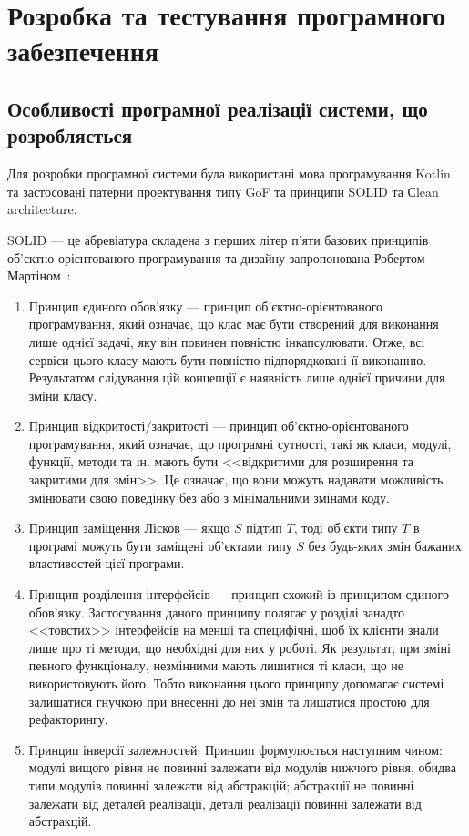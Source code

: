 \section{Розробка та тестування програмного забезпечення}
\subsection{Особливості програмної реалізації системи, що розробляється}
Для розробки програмної системи була використані мова програмування Kotlin та застосовані патерни проектування типу GoF та принципи SOLID та Сlean architecture.

SOLID --- це абревіатура складена з перших літер п'яти базових принципів об'єктно-орієнтованого програмування та дизайну запропонована Робертом Мартіном~\cite{Arch2007}:
\begin{enumerate}
	\item Принцип єдиного обов'язку --- принцип об'єктно-орієнтованого програмування, який означає, що клас має бути створений для виконання лише однієї задачі, яку він повинен повністю інкапсулювати. 
	Отже, всі сервіси цього класу мають бути повністю підпорядковані її виконанню. 
	Результатом слідування цій концепції є наявність лише однієї причини для зміни класу.
	\item Принцип відкритості/закритості --- принцип об'єктно-орієнтованого програмування, який означає, що програмні сутності, такі як класи, модулі, функції, методи та ін. мають бути <<відкритими для розширення та закритими для змін>>. 
	Це означає, що вони можуть надавати можливість змінювати свою поведінку без або з мінімальними змінами коду.
	\item Принцип заміщення Лісков --- якщо $S$ підтип $T$, тоді об'єкти типу $T$ в програмі можуть бути заміщені об'єктами типу $S$ без будь-яких змін бажаних властивостей цієї програми.
	\item Принцип розділення інтерфейсів --- принцип схожий із принципом єдиного обов'язку. 
	Застосування даного принципу полягає у розділі занадто <<товстих>> інтерфейсів на менші та специфічні, щоб їх клієнти знали лише про ті методи, що необхідні для них у роботі. 
	Як результат, при зміні певного функціоналу, незмінними мають лишитися ті класи, що не використовують його. 
	Тобто виконання цього принципу допомагає системі залишатися гнучкою при внесенні до неї змін та лишатися простою для рефакторингу.
	\item Принцип інверсії залежностей. 
	Принцип формулюється наступним чином: модулі вищого рівня не повинні залежати від модулів нижчого рівня, обидва типи модулів повинні залежати від абстракцій; абстракції не повинні залежати від деталей реалізації, деталі реалізації повинні залежати від абстракцій.
\end{enumerate}

